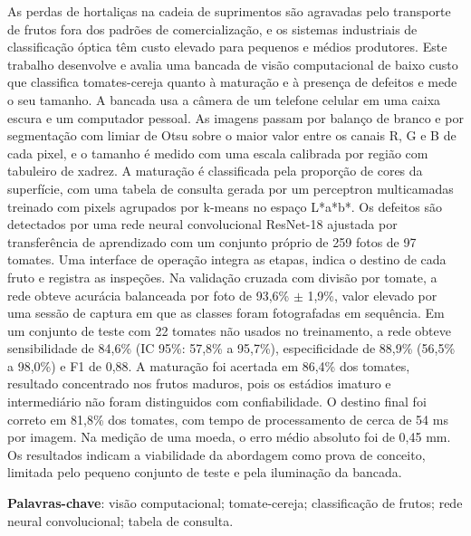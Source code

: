 \setlength{\absparsep}{18pt} %
\begin{resumo}
	\SingleSpacing
	As perdas de hortaliças na cadeia de suprimentos são agravadas pelo transporte de frutos fora dos padrões de comercialização, e os sistemas industriais de classificação óptica têm custo elevado para pequenos e médios produtores. Este trabalho desenvolve e avalia uma bancada de visão computacional de baixo custo que classifica tomates-cereja quanto à maturação e à presença de defeitos e mede o seu tamanho. A bancada usa a câmera de um telefone celular em uma caixa escura e um computador pessoal. As imagens passam por balanço de branco e por segmentação com limiar de Otsu sobre o maior valor entre os canais R, G e B de cada pixel, e o tamanho é medido com uma escala calibrada por região com tabuleiro de xadrez. A maturação é classificada pela proporção de cores da superfície, com uma tabela de consulta gerada por um perceptron multicamadas treinado com pixels agrupados por k-means no espaço L*a*b*. Os defeitos são detectados por uma rede neural convolucional ResNet-18 ajustada por transferência de aprendizado com um conjunto próprio de 259 fotos de 97 tomates. Uma interface de operação integra as etapas, indica o destino de cada fruto e registra as inspeções. Na validação cruzada com divisão por tomate, a rede obteve acurácia balanceada por foto de 93,6\% $\pm$ 1,9\%, valor elevado por uma sessão de captura em que as classes foram fotografadas em sequência. Em um conjunto de teste com 22 tomates não usados no treinamento, a rede obteve sensibilidade de 84,6\% (IC 95\%: 57,8\% a 95,7\%), especificidade de 88,9\% (56,5\% a 98,0\%) e F1 de 0,88. A maturação foi acertada em 86,4\% dos tomates, resultado concentrado nos frutos maduros, pois os estádios imaturo e intermediário não foram distinguidos com confiabilidade. O destino final foi correto em 81,8\% dos tomates, com tempo de processamento de cerca de 54 ms por imagem. Na medição de uma moeda, o erro médio absoluto foi de 0,45 mm. Os resultados indicam a viabilidade da abordagem como prova de conceito, limitada pelo pequeno conjunto de teste e pela iluminação da bancada.

	\textbf{Palavras-chave}: visão computacional; tomate-cereja; classificação de frutos; rede neural convolucional; tabela de consulta.
\end{resumo}

